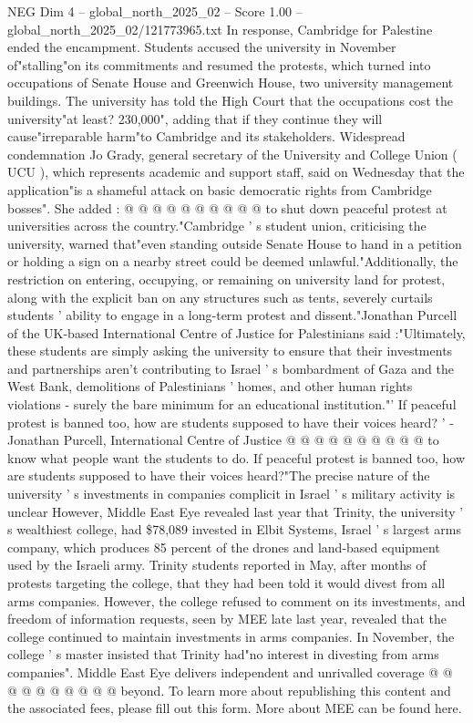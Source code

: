 \begin{textsample}{NEG Dim 4 – global\_north\_2025\_02 – Score 1.00 – global\_north\_2025\_02/121773965.txt}
In response, Cambridge for Palestine ended the encampment.
Students accused the university in November of"stalling"on its commitments and resumed the protests, which turned into occupations of Senate House and Greenwich House, two university management buildings.
The university has told the High Court that the occupations cost the university"at least? 230,000", adding that if they continue they will cause"irreparable harm"to Cambridge and its stakeholders.
Widespread condemnation Jo Grady, general secretary of the University and College Union ( UCU ), which represents academic and support staff, said on Wednesday that the application"is a shameful attack on basic democratic rights from Cambridge bosses".
She added : @ @ @ @ @ @ @ @ @ @ to shut down peaceful protest at universities across the country."Cambridge ' s student union, criticising the university, warned that"even standing outside Senate House to hand in a petition or holding a sign on a nearby street could be deemed unlawful."Additionally, the restriction on entering, occupying, or remaining on university land for protest, along with the explicit ban on any structures such as tents, severely curtails students ' ability to engage in a long-term protest and dissent."Jonathan Purcell of the UK-based International Centre of Justice for Palestinians said :"Ultimately, these students are simply asking the university to ensure that their investments and partnerships aren't contributing to Israel ' s bombardment of Gaza and the West Bank, demolitions of Palestinians ' homes, and other human rights violations - surely the bare minimum for an educational institution."' If peaceful protest is banned too, how are students supposed to have their voices heard? ' - Jonathan Purcell, International Centre of Justice @ @ @ @ @ @ @ @ @ @ to know what people want the students to do.
If peaceful protest is banned too, how are students supposed to have their voices heard?"The precise nature of the university ' s investments in companies complicit in Israel ' s military activity is unclear However, Middle East Eye revealed last year that Trinity, the university ' s wealthiest college, had \$78,089 invested in Elbit Systems, Israel ' s largest arms company, which produces 85 percent of the drones and land-based equipment used by the Israeli army.
Trinity students reported in May, after months of protests targeting the college, that they had been told it would divest from all arms companies.
However, the college refused to comment on its investments, and freedom of information requests, seen by MEE late last year, revealed that the college continued to maintain investments in arms companies.
In November, the college ' s master insisted that Trinity had"no interest in divesting from arms companies".
Middle East Eye delivers independent and unrivalled coverage @ @ @ @ @ @ @ @ @ @ beyond.
To learn more about republishing this content and the associated fees, please fill out this form.
More about MEE can be found here.

\end{textsample}

